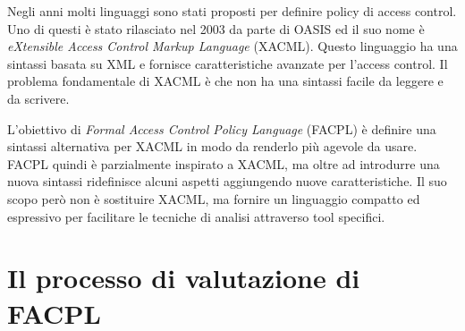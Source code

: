 \label{cap:facpl}
Negli anni molti linguaggi sono stati proposti per definire policy di access control. Uno di questi è stato rilasciato nel 2003 da parte di OASIS ed il suo nome è \textit{eXtensible Access Control Markup Language} (XACML). Questo linguaggio ha una sintassi basata su XML e fornisce caratteristiche avanzate per l'access control. Il problema fondamentale di XACML è che non ha una sintassi facile da leggere e da scrivere. \\ \par
L'obiettivo di \textit{Formal Access Control Policy Language} (FACPL) è definire una sintassi alternativa per XACML in modo da renderlo più agevole da usare.
FACPL quindi è parzialmente inspirato a XACML, ma oltre ad introdurre una nuova sintassi ridefinisce alcuni aspetti aggiungendo nuove caratteristiche. Il suo scopo però non è sostituire XACML, ma fornire un linguaggio compatto ed espressivo per facilitare le tecniche di analisi attraverso tool specifici.

\section{Il processo di valutazione di FACPL}
\label{sec:valutazione_facpl}


